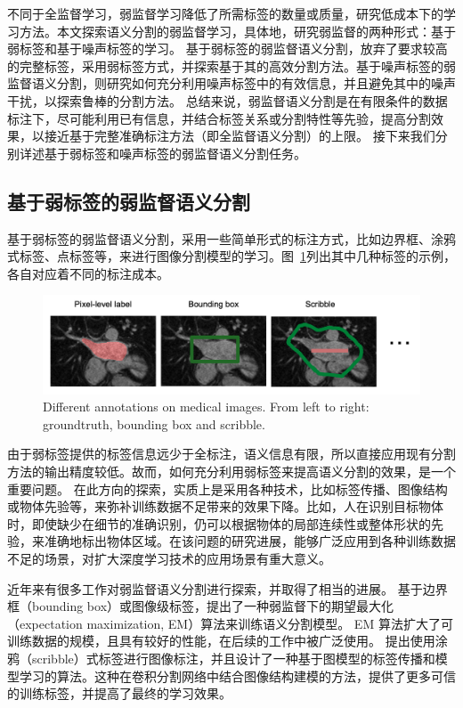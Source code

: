 不同于全监督学习，弱监督学习降低了所需标签的数量或质量，研究低成本下的学习方法。本文探索语义分割的弱监督学习，具体地，研究弱监督的两种形式：基于弱标签和基于噪声标签的学习。
基于弱标签的弱监督语义分割\citep{papandreou2015weakly,rajchl2016deepcut,cai2018accurate,ji2019scribble,kervadec2020bounding}，放弃了要求较高的完整标签，采用弱标签方式，并探索基于其的高效分割方法。基于噪声标签的弱监督语义分割\citep{Zhu2019PickandLearnAQ,Xue2020CascadedRL,Zhang2020RobustMI}，则研究如何充分利用噪声标签中的有效信息，并且避免其中的噪声干扰，以探索鲁棒的分割方法。
总结来说，弱监督语义分割是在有限条件的数据标注下，尽可能利用已有信息，并结合标签关系或分割特性等先验，提高分割效果，以接近基于完整准确标注方法（即全监督语义分割）的上限。
接下来我们分别详述基于弱标签和噪声标签的弱监督语义分割任务。

\subsection{基于弱标签的弱监督语义分割}
基于弱标签的弱监督语义分割，采用一些简单形式的标注方式，比如边界框、涂鸦式标签、点标签等，来进行图像分割模型的学习。图~\ref{c1_fig2}列出其中几种标签的示例，各自对应着不同的标注成本。
    \begin{figure}[t!]
        \centering 
        \includegraphics[width=1.0\textwidth]{img/c1/f12m.png}
        {Different annotations on medical images. From left to right: groundtruth, bounding box and scribble.}
        \label{c1_fig2}
    \end{figure}
由于弱标签提供的标签信息远少于全标注，语义信息有限，所以直接应用现有分割方法的输出精度较低。故而，如何充分利用弱标签来提高语义分割的效果，是一个重要问题。
在此方向的探索，实质上是采用各种技术，比如标签传播、图像结构或物体先验等，来弥补训练数据不足带来的效果下降。比如，人在识别目标物体时，即使缺少在细节的准确识别，仍可以根据物体的局部连续性或整体形状的先验，来准确地标出物体区域。在该问题的研究进展，能够广泛应用到各种训练数据不足的场景，对扩大深度学习技术的应用场景有重大意义。

近年来有很多工作对弱监督语义分割进行探索，并取得了相当的进展。
\citet{papandreou2015weakly} 基于边界框（bounding box）或图像级标签，提出了一种弱监督下的期望最大化（expectation maximization, EM）算法来训练语义分割模型。
EM 算法扩大了可训练数据的规模，且具有较好的性能，在后续的工作中被广泛使用。
\citet{lin2016scribblesup} 提出使用涂鸦（scribble）式标签进行图像标注，并且设计了一种基于图模型的标签传播和模型学习的算法。这种在卷积分割网络中结合图像结构建模的方法，提供了更多可信的训练标签，并提高了最终的学习效果。

